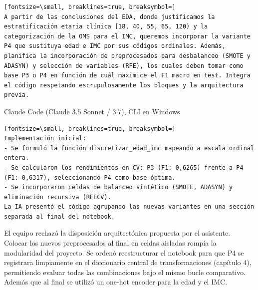 \documentclass[12pt,a4paper,oneside]{book}
\begin{document}
\begin{iaprompt}
\begin{Verbatim}[fontsize=\small, breaklines=true, breaksymbol=]
A partir de las conclusiones del EDA, donde justificamos la estratificación etaria clínica [18, 40, 55, 65, 120) y la categorización de la OMS para el IMC, queremos incorporar la variante P4 que sustituya edad e IMC por sus códigos ordinales. Además, planifica la incorporación de preprocesados para desbalanceo (SMOTE y ADASYN) y selección de variables (RFE), los cuales deben tomar como base P3 o P4 en función de cuál maximice el F1 macro en test. Integra el código respetando escrupulosamente los bloques y la arquitectura previa.
\end{Verbatim}
\end{iaprompt}
\begin{iaresp}{Claude Code (Claude 3.5 Sonnet / 3.7), CLI en Windows}
\begin{Verbatim}[fontsize=\small, breaklines=true, breaksymbol=]
Implementación inicial:
- Se formuló la función discretizar_edad_imc mapeando a escala ordinal entera.
- Se calcularon los rendimientos en CV: P3 (F1: 0,6265) frente a P4 (F1: 0,6317), seleccionando P4 como base óptima.
- Se incorporaron celdas de balanceo sintético (SMOTE, ADASYN) y eliminación recursiva (RFECV).
La IA presentó el código agrupando las nuevas variantes en una sección separada al final del notebook.
\end{Verbatim}
\end{iaresp}
\begin{iaanalisis}
El equipo rechazó la disposición arquitectónica propuesta por el asistente. Colocar los nuevos preprocesados al final en celdas aisladas rompía la modularidad del proyecto. Se ordenó reestructurar el notebook para que P4 se registrara limpiamente en el diccionario central de transformaciones (capítulo 4), permitiendo evaluar todas las combinaciones bajo el mismo bucle comparativo. Además que al final se utilizó un one-hot encoder para la edad y el IMC.
\end{iaanalisis}
\end{document}

